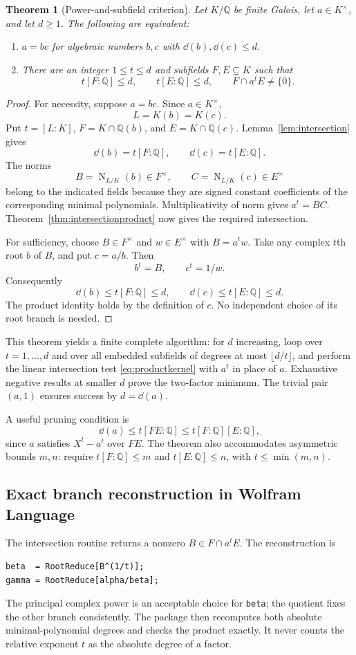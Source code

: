 \documentclass[11pt,a4paper]{article}
\newtheorem{theorem}{Theorem}[section]
\theoremstyle{definition}\newtheorem{definition}[theorem]{Definition}
\theoremstyle{remark}\newtheorem{remark}[theorem]{Remark}
\newcommand{\Q}{\mathbb Q}\newcommand{\C}{\mathbb C}\newcommand{\Z}{\mathbb Z}
\newcommand{\Nm}{\operatorname{N}}\newcommand{\Res}{\operatorname{Res}}
\newcommand{\wl}[1]{\texttt{#1}}
\begin{document}
\begin{theorem}[Power-and-subfield criterion]
\label{thm:binary}
Let $K/\Q$ be finite Galois, let $a\in K^\times$, and let $d\ge1$. The following are equivalent:
\begin{enumerate}
\item $a=bc$ for algebraic numbers $b,c$ with $\dd(b),\dd(c)\le d$.
\item There are an integer $1\le t\le d$ and subfields $F,E\subseteq K$ such that
\begin{equation}
 t[F:\Q]\le d,\qquad t[E:\Q]\le d,\qquad
 F\cap a^tE\ne\{0\}.
 \label{eq:binarycriterion}
\end{equation}
\end{enumerate}
\end{theorem}
\begin{proof}
For necessity, suppose $a=bc$. Since $a\in K^\times$,
\[
 L=K(b)=K(c).
\]
Put $t=[L:K]$, $F=K\cap\Q(b)$, and $E=K\cap\Q(c)$. Lemma~\ref{lem:intersection} gives
\[
 \dd(b)=t[F:\Q],\qquad \dd(c)=t[E:\Q].
\]
The norms
\[
 B=\Nm_{L/K}(b)\in F^\times,\qquad
 C=\Nm_{L/K}(c)\in E^\times
\]
belong to the indicated fields because they are signed constant coefficients of the corresponding minimal polynomials. Multiplicativity of norm gives $a^t=BC$. Theorem~\ref{thm:intersectionproduct} now gives the required intersection.

For sufficiency, choose $B\in F^\times$ and $w\in E^\times$ with $B=a^t w$. Take any complex $t$th root $b$ of $B$, and put $c=a/b$. Then
\[
 b^t=B,\qquad c^t=1/w.
\]
Consequently
\[
 \dd(b)\le t[F:\Q]\le d,\qquad
 \dd(c)\le t[E:\Q]\le d.
\]
The product identity holds by the definition of $c$. No independent choice of its root branch is needed.
\end{proof}

This theorem yields a finite complete algorithm: for $d$ increasing, loop over $t=1,\ldots,d$ and over all embedded subfields of degrees at most $\lfloor d/t\rfloor$, and perform the linear intersection test \eqref{eq:productkernel} with $a^t$ in place of $a$. Exhaustive negative results at smaller $d$ prove the two-factor minimum. The trivial pair $(a,1)$ ensures success by $d=\dd(a)$.

A useful pruning condition is
\[
 \dd(a)\le t[FE:\Q]\le t[F:\Q][E:\Q],
\]
since $a$ satisfies $X^t-a^t$ over $FE$. The theorem also accommodates asymmetric bounds $m,n$: require $t[F:\Q]\le m$ and $t[E:\Q]\le n$, with $t\le\min(m,n)$.

\subsection{Exact branch reconstruction in Wolfram Language}
The intersection routine returns a nonzero $B\in F\cap a^tE$. The reconstruction is
\begin{lstlisting}
beta  = RootReduce[B^(1/t)];
gamma = RootReduce[alpha/beta];
\end{lstlisting}
The principal complex power is an acceptable choice for \wl{beta}; the quotient fixes the other branch consistently. The package then recomputes both absolute minimal-polynomial degrees and checks the product exactly. It never counts the relative exponent $t$ as the absolute degree of a factor.
\end{document}
